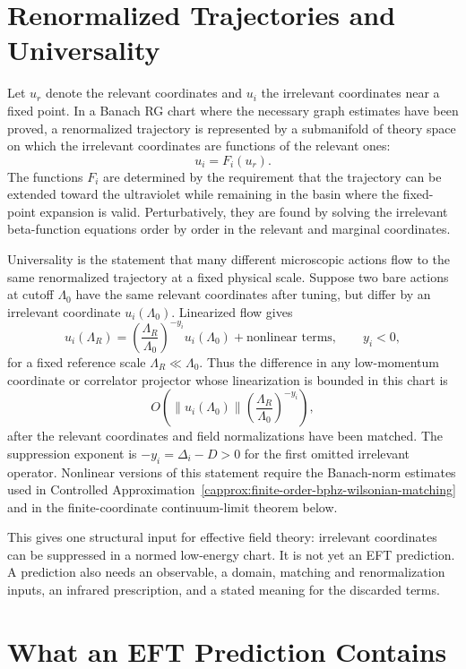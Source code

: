 \section{Renormalized Trajectories and Universality}

Let \(u_r\) denote the relevant coordinates and \(u_i\) the irrelevant
coordinates near a fixed point.  In a Banach RG chart where the necessary graph
estimates have been proved, a renormalized trajectory is represented by a
submanifold of theory space on which the irrelevant coordinates are functions
of the relevant ones:
\[
  u_i=F_i(u_r).
\]
The functions \(F_i\) are determined by the requirement that the trajectory can
be extended toward the ultraviolet while remaining in the basin where the
fixed-point expansion is valid.  Perturbatively, they are found by solving the
irrelevant beta-function equations order by order in the relevant and marginal
coordinates.

Universality is the statement that many different microscopic actions flow to
the same renormalized trajectory at a fixed physical scale.  Suppose two bare
actions at cutoff \(\Lambda_0\) have the same relevant coordinates after
tuning, but differ by an irrelevant coordinate \(u_i(\Lambda_0)\).  Linearized
flow gives
\[
  u_i(\Lambda_R)
  =
  \left(\frac{\Lambda_R}{\Lambda_0}\right)^{-y_i}
  u_i(\Lambda_0)
  +\text{nonlinear terms},
  \qquad
  y_i<0,
\]
for a fixed reference scale \(\Lambda_R\ll\Lambda_0\).  Thus the difference in
any low-momentum coordinate or correlator projector whose linearization is
bounded in this chart is
\[
  O\!\left(
    \|u_i(\Lambda_0)\|
    \left(\frac{\Lambda_R}{\Lambda_0}\right)^{-y_i}
  \right),
\]
after the relevant coordinates and field normalizations have been matched.
The suppression exponent is \(-y_i=\Delta_i-D>0\) for the first omitted
irrelevant operator.  Nonlinear versions of this statement require the
Banach-norm estimates used in
Controlled Approximation~\ref{capprox:finite-order-bphz-wilsonian-matching}
and in the
finite-coordinate continuum-limit theorem below.

This gives one structural input for effective field theory: irrelevant
coordinates can be suppressed in a normed low-energy chart.  It is not yet an
EFT prediction.  A prediction also needs an observable, a domain, matching and
renormalization inputs, an infrared prescription, and a stated meaning for the
discarded terms.

\section{What an EFT Prediction Contains}
\label{sec:eft-prediction-datum}

